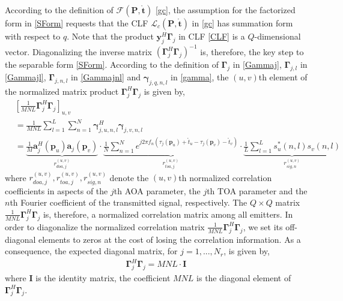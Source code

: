 \documentclass[review]{elsarticle}
\begin{document}
According to the definition of $\mathcal{F}(\boldsymbol{P},\mathring{\boldsymbol{t}})$ \eqref{gc}, the assumption for the factorized form in \eqref{SForm} requests that the CLF $\mathcal{L}_c(\boldsymbol{P},\mathring{\boldsymbol{t}})$ in \eqref{gc} has summation form with respect to $q$. Note that the product $\boldsymbol{y}_j^H\boldsymbol{\Gamma}_{j}$ in CLF \eqref{CLF} is a $Q$-dimensional vector. Diagonalizing the inverse matrix $(\boldsymbol{\Gamma}_{j}^H\boldsymbol{\Gamma}_{j})^{-1}$ is, therefore, the key step to the separable form \eqref{SForm}. According to the definition of $\boldsymbol{\Gamma}_{j}$ in \eqref{Gammaj},  $\boldsymbol{\Gamma}_{j,l}$ in \eqref{Gammajl}, $\boldsymbol{\Gamma}_{j,n,l}$ in \eqref{Gammajnl} and $\boldsymbol{\gamma}_{j,q,n,l}$ in \eqref{gamma}, the $(u,v)$th element of the normalized matrix product $\boldsymbol{\Gamma}_{j}^H\boldsymbol{\Gamma}_{j}$ is given by,
\begin{align}\label{off-diagonal}
    &[\frac{1}{MNL}\boldsymbol{\Gamma}_{j}^H\boldsymbol{\Gamma}_{j}]_{u,v}\\
    &=\frac{1}{MNL}\sum_{l=1}^L\sum_{n=1}^N \boldsymbol{\gamma}_{j,u,n,l}^H\boldsymbol{\gamma}_{j,v,n,l}\\
    &=\underbrace{\frac{1}{M}\boldsymbol{a}_j^H(\boldsymbol{p}_u)\boldsymbol{a}_j(\boldsymbol{p}_v)}_{r_{doa,j}^{(u,v)}}\cdot\underbrace{\frac{1}{N}\sum_{n=1}^N e^{j2\pi f_n(\tau_j(\boldsymbol{p}_u)+\mathring{t}_u-\tau_j(\boldsymbol{p}_v)-\mathring{t}_v)}}_{r_{toa,j}^{(u,v)}}\cdot \underbrace{\frac{1}{L}\sum_{l=1}^L s_u^\ast(n,l)s_v(n,l)}_{r_{sig,n}^{(u,v)}}
\end{align}
where $r_{doa,j}^{(u,v)}, r_{toa,j}^{(u,v)}, r_{sig,n}^{(u,v)}$ denote the $(u,v)$th normalized correlation coefficients in aspects of the $j$th AOA parameter, the $j$th TOA parameter and the $n$th Fourier coefficient of the transmitted signal, respectively. The $Q\times Q$ matrix $\frac{1}{MNL}\boldsymbol{\Gamma}_{j}^H\boldsymbol{\Gamma}_{j}$ is, therefore, a normalized correlation matrix among all emitters. In order to diagonalize the normalized correlation matrix $\frac{1}{MNL}\boldsymbol{\Gamma}_{j}^H\boldsymbol{\Gamma}_{j}$, we set its off-diagonal elements to zeros at the cost of losing the correlation information. As a consequence, the expected diagonal matrix, for $j=1,...,N_r$, is given by,
\begin{align}\label{GammaDiag}
    \boldsymbol{\Gamma}_{j}^H\boldsymbol{\Gamma}_{j}=MNL\cdot \boldsymbol{I}
\end{align}
where $\boldsymbol{I}$ is the identity matrix, the coefficient $MNL$ is the diagonal element of $\boldsymbol{\Gamma}_{j}^H\boldsymbol{\Gamma}_{j}$. 
\end{document}
